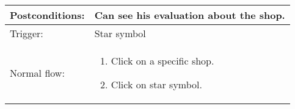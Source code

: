 \begin{longtable}{| p{3.5cm} | p{9cm} |}
\hline
Postconditions: & Can see his evaluation about the shop. \\
\hline
Trigger: & Star symbol\\
\hline
Normal flow: &\mbox{}\par\vspace{-\baselineskip}
\begin{enumerate}
\item Click on a specific shop.
\item Click on star symbol.
\end{enumerate}\\
\hline
\end{longtable}

